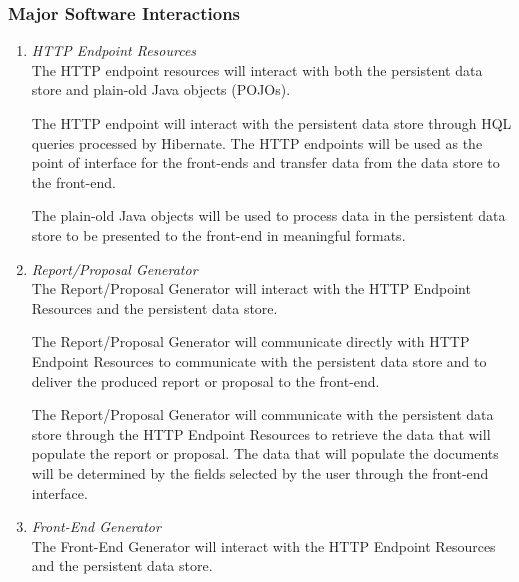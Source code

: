 \documentclass{article}
\newcommand{\br}{\vspace{2mm}}
\begin{document}

\subsubsection{Major Software Interactions}
\label{msi}

\begin{enumerate}
    \item[~\ref{msi}.1 ] \emph{HTTP Endpoint Resources}\br\\
        The HTTP endpoint resources will interact with both the persistent
        data store and plain-old Java objects (POJOs).

        The HTTP endpoint will interact with the persistent data store through
        HQL queries processed by Hibernate.  The HTTP endpoints will be used as
        the point of interface for the front-ends and transfer data from the
        data store to the front-end.

        The plain-old Java objects will be used to process data in the persistent
        data store to be presented to the front-end in meaningful formats.
    \item[~\ref{msi}.2 ] \emph{Report/Proposal Generator}\br\\
        The Report/Proposal Generator will interact with the HTTP Endpoint
        Resources and the persistent data store.

        The Report/Proposal Generator will communicate directly with HTTP Endpoint
        Resources to communicate with the persistent data store and to deliver
        the produced report or proposal to the front-end.

        The Report/Proposal Generator will communicate with the persistent
        data store through the HTTP Endpoint Resources to retrieve the data
        that will populate the report or proposal.  The data that will populate
        the documents will be determined by the fields selected by the user
        through the front-end interface.
    \item[~\ref{msi}.3 ] \emph{Front-End Generator}\br\\
        The Front-End Generator will interact with the HTTP Endpoint Resources
        and the persistent data store.


\end{enumerate}
\end{document}
